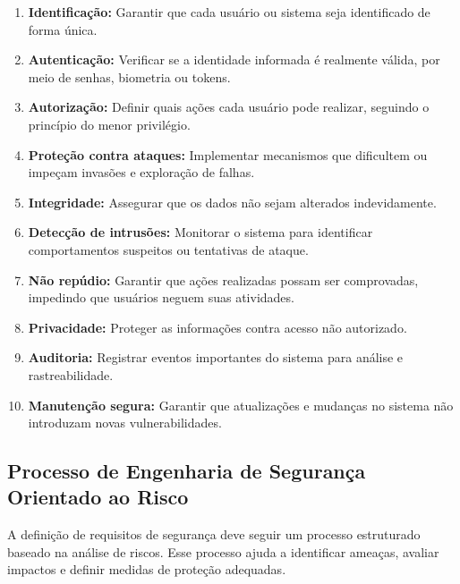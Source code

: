 \documentclass[12pt,a4paper,twoside]{report}
\begin{document}
\begin{enumerate}
    \item \textbf{Identificação:} Garantir que cada usuário ou sistema seja identificado de forma única.
    
    \item \textbf{Autenticação:} Verificar se a identidade informada é realmente válida, por meio de senhas, biometria ou tokens.
    
    \item \textbf{Autorização:} Definir quais ações cada usuário pode realizar, seguindo o princípio do menor privilégio.
    
    \item \textbf{Proteção contra ataques:} Implementar mecanismos que dificultem ou impeçam invasões e exploração de falhas.
    
    \item \textbf{Integridade:} Assegurar que os dados não sejam alterados indevidamente.
    
    \item \textbf{Detecção de intrusões:} Monitorar o sistema para identificar comportamentos suspeitos ou tentativas de ataque.
    
    \item \textbf{Não repúdio:} Garantir que ações realizadas possam ser comprovadas, impedindo que usuários neguem suas atividades.
    
    \item \textbf{Privacidade:} Proteger as informações contra acesso não autorizado.
    
    \item \textbf{Auditoria:} Registrar eventos importantes do sistema para análise e rastreabilidade.
    
    \item \textbf{Manutenção segura:} Garantir que atualizações e mudanças no sistema não introduzam novas vulnerabilidades.
\end{enumerate}

\subsection{Processo de Engenharia de Segurança Orientado ao Risco}

A definição de requisitos de segurança deve seguir um processo estruturado baseado na análise de riscos. Esse processo ajuda a identificar ameaças, avaliar impactos e definir medidas de proteção adequadas.
\end{document}
